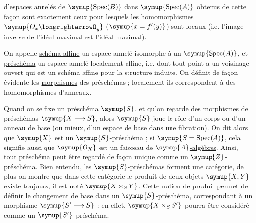 d'espaces annelés de $\symup{\operatorname{Spec}(B)}$ dans
$\symup{\operatorname{Spec}(A)}$ obtenus de cette façon sont exactement ceux pour
lesquels les homomorphismes $\symup{O_x\longrightarrowO_y}$ ($\symup{x=f'(y)}$) sont
locaux (i.e. l'image inverse de l'idéal maximal est l'idéal maximal).

On appelle \uline{schéma affine} un espace annelé isomorphe à un
$\symup{\operatorname{Spec}(A)}$, et \uline{préschéma} un espace annelé localement
affine, i.e. dont tout point a un voisinage ouvert qui est un schéma affine pour
la structure induite. On définit de façon évidente les \uline{morphismes} des
préschémas ; localement ils correspondent à des homomorphismes d'anneaux.

Quand on se fixe un préschéma $\symup{S}$, et qu'on regarde des morphismes de préschémas
$\symup{X\longrightarrow S}$, alors $\symup{S}$ joue le rôle d'un corps ou d'un anneau de base
(ou mieux, d'un espace de base dans une fibration). On dit alors que $\symup{X}$ est un
$\symup{S}$-préschéma ; si $\symup{S=\operatorname{Spec}(A)}$, cela signifie aussi que $\symup{O_X}$
est un faisceau de $\symup{A}$\uline{-algèbres}. Ainsi, tout préschéma peut être regardé de
façon unique comme un $\symup{Z}$-préschéma. Bien entendu, les $\symup{S}$-préschémas
forment une catégorie, de plus on montre que dans cette catégorie le produit
de deux objets $\symup{X,Y}$ existe toujours, il est noté $\symup{X\times_S Y}$. Cette notion
de produit permet de définir le changement de base dans un $\symup{S}$-préschéma,
correspondant à un morphisme $\symup{S'\longrightarrow S}$ : en effet,
$\symup{X\times_S S'}$ pourra être considéré comme un $\symup{S'}$-préschéma.


